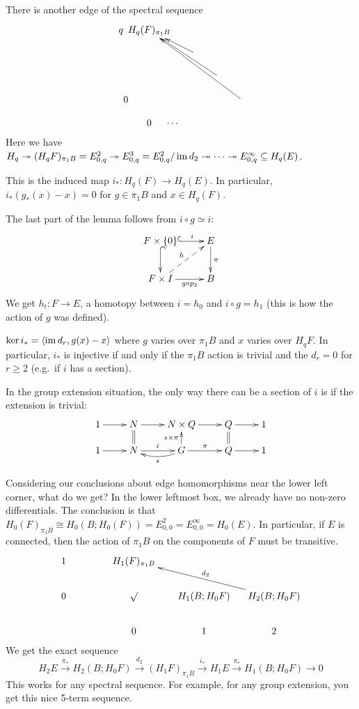 There is another edge of the spectral sequence
\[\xymatrix @!0{
 q\quad & H_q(F)_{\pi_1 B} \ar@{<-}[drr]\ar@{<-}[ddrrr]\ar@{<-}[dddrrrr]\\
 &&&\\
 &&&&\\
 0&&&&&\\ 
 & 0 & \cdots
}\]
Here we have $H_q\twoheadrightarrow (H_q F)_{\pi_1 B}=E^2_{0,q} \twoheadrightarrow E^3_{0,q}=E^2_{0,q}/\operatorname{im} d_2\twoheadrightarrow \cdots \twoheadrightarrow E^\infty_{0,q}\subseteq H_q(E)$.
\begin{lemma}
 This is the induced map $i_*\colon H_q(F)\to H_q(E)$. In particular, $i_*(g_*(x)-x)=0$ for $g\in \pi_1B$ and $x\in H_q(F)$.
\end{lemma}
The last part of the lemma follows from $i\circ g\simeq i$:
\[\xymatrix{
 F\times \{0\} \ar@{^(->}[d] \ar@{^(->}[r]^-i & E\ar[d]^\pi \\
 F\times I \ar@{-->}[ur]^{h} \ar[r]_-{g\circ p_2} & B
}\]
We get $h_t\colon F\to E$, a homotopy between $i=h_0$ and $i\circ g=h_1$ (this is how the action of $g$ was defined).
\begin{corollary}
 $\ker i_* = \langle\operatorname{im} d_r, g(x)-x\rangle$ where $g$ varies over $\pi_1 B$ and $x$ varies over $H_q F$. In particular, $i_*$ is injective if and only if the $\pi_1 B$ action is trivial and the $d_r=0$ for $r\ge 2$ (e.g.~if $i$ has a section).
\end{corollary}
In the group extension situation, the only way there can be a section of $i$ is if the extension is trivial:
\[\xymatrix@R-1pc{
 1 \ar[r] & N\ar@{=}[d]\ar[r] & N\times Q \ar[r] & Q\ar@{=}[d] \ar[r] & 1\\
 1\ar[r]& N\ar[r]^i & G \ar[u]^{s\times \pi}\ar[r]^\pi \ar@/^/[l]^s & Q\ar[r] & 1
}\]

Considering our conclusions about edge homomorphisms near the lower left corner, what do we get? In the lower leftmost box, we already have no non-zero differentials. The conclusion is that $H_0(F)_{\pi_1 B}\cong H_0(B;H_0(F))=E^2_{0,0}=E^\infty_{0,0}=H_0(E)$.  In particular, if $E$ is connected, then the action of $\pi_1 B$ on the components of $F$ must be transitive. 
\[\xymatrix @!0 @C+4pc @R+1pc{
 1& H_1(F)_{\pi_1 B}\\
 0& \surd & H_1(B;H_0 F) & H_2(B;H_0 F)\ar[ull]_{d_2}\\
 & 0 & 1 & 2 
}\]
We get the exact sequence
\[
 H_2 E\xrightarrow{\pi_*} H_2(B;H_0 F) \xrightarrow{d_2} (H_1 F)_{\pi_1 B} \xrightarrow{i_*} H_1 E \xrightarrow{\pi_*} H_1(B;H_0 F)\to 0
\]
This works for any spectral sequence. For example, for any group extension, you get this nice 5-term sequence.

